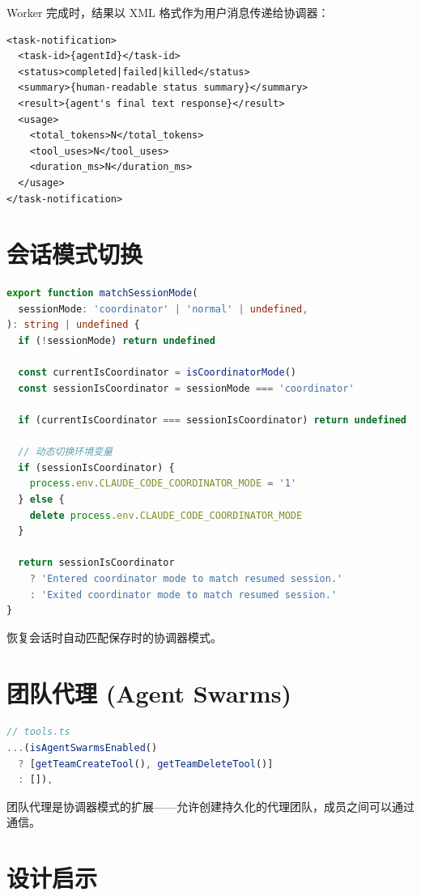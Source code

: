 Worker 完成时，结果以 XML 格式作为用户消息传递给协调器：

\begin{lstlisting}[breaklines=true]
<task-notification>
  <task-id>{agentId}</task-id>
  <status>completed|failed|killed</status>
  <summary>{human-readable status summary}</summary>
  <result>{agent's final text response}</result>
  <usage>
    <total_tokens>N</total_tokens>
    <tool_uses>N</tool_uses>
    <duration_ms>N</duration_ms>
  </usage>
</task-notification>
\end{lstlisting}

\section{会话模式切换}

\begin{lstlisting}[language=TypeScript,breaklines=true]
export function matchSessionMode(
  sessionMode: 'coordinator' | 'normal' | undefined,
): string | undefined {
  if (!sessionMode) return undefined

  const currentIsCoordinator = isCoordinatorMode()
  const sessionIsCoordinator = sessionMode === 'coordinator'

  if (currentIsCoordinator === sessionIsCoordinator) return undefined

  // 动态切换环境变量
  if (sessionIsCoordinator) {
    process.env.CLAUDE_CODE_COORDINATOR_MODE = '1'
  } else {
    delete process.env.CLAUDE_CODE_COORDINATOR_MODE
  }

  return sessionIsCoordinator
    ? 'Entered coordinator mode to match resumed session.'
    : 'Exited coordinator mode to match resumed session.'
}
\end{lstlisting}

恢复会话时自动匹配保存时的协调器模式。

\section{团队代理 (Agent Swarms)}

\begin{lstlisting}[language=TypeScript,breaklines=true]
// tools.ts
...(isAgentSwarmsEnabled()
  ? [getTeamCreateTool(), getTeamDeleteTool()]
  : []),
\end{lstlisting}

团队代理是协调器模式的扩展——允许创建持久化的代理团队，成员之间可以通过  通信。

\section{设计启示}

